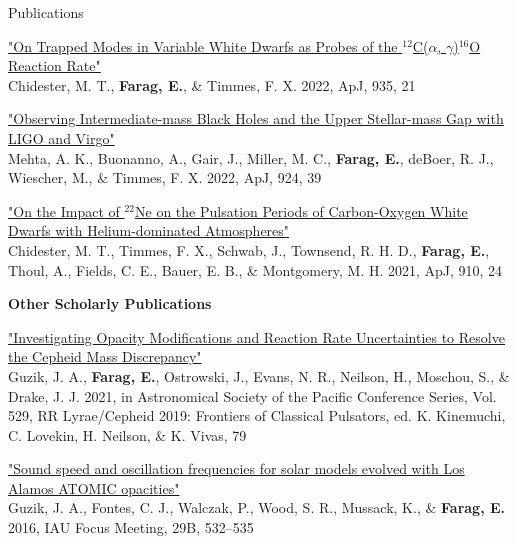 \begin{rSection}{Publications}
\begin{revnumerate}
\item \href{https://ui.adsabs.harvard.edu/abs/2022ApJ...935...21C/abstract}{"On Trapped Modes in Variable White Dwarfs as Probes of the $^{12}$C($\alpha$, $\gamma$)$^{16}$O Reaction Rate"}
\\ Chidester, M. T., \textbf{Farag, E.}, \& Timmes, F. X. 2022, ApJ, 935, 21

\item \href{https://ui.adsabs.harvard.edu/abs/2022ApJ...924...39M/abstract}{"Observing Intermediate-mass Black Holes and the Upper Stellar-mass Gap with LIGO and Virgo"}
\\ Mehta, A. K., Buonanno, A., Gair, J., Miller, M. C., \textbf{Farag, E.}, deBoer, R. J., Wiescher, M., \& Timmes, F. X. 2022, ApJ, 924, 39

\item \href{https://ui.adsabs.harvard.edu/abs/2021ApJ...910...24C/abstract}{"On the Impact of $^{22}$Ne on the Pulsation Periods of Carbon-Oxygen White Dwarfs with Helium-dominated Atmospheres"}
\\ Chidester, M. T., Timmes, F. X., Schwab, J., Townsend, R. H. D., \textbf{Farag, E.}, Thoul, A., Fields, C. E., Bauer, E. B., \& Montgomery, M. H. 2021, ApJ, 910, 24

\end{revnumerate}

\textbf{Other Scholarly Publications}
\begin{revnumerate}
\item \href{https://ui.adsabs.harvard.edu/abs/2021ASPC..529...79G/abstract}{"Investigating Opacity Modifications and Reaction Rate Uncertainties to Resolve the Cepheid Mass Discrepancy"}
\\ Guzik, J. A., \textbf{Farag, E.}, Ostrowski, J., Evans, N. R., Neilson, H., Moschou, S., \& Drake, J. J. 2021, in Astronomical Society of the Pacific Conference Series, Vol. 529, RR Lyrae/Cepheid 2019: Frontiers of Classical Pulsators, ed. K. Kinemuchi, C. Lovekin, H. Neilson, \& K. Vivas, 79

\item \href{https://ui.adsabs.harvard.edu/abs/2016IAUFM..29B.532G/abstract}{"Sound speed and oscillation frequencies for solar models evolved with Los Alamos ATOMIC opacities"}
\\ Guzik, J. A., Fontes, C. J., Walczak, P., Wood, S. R., Mussack, K., \& \textbf{Farag, E.} 2016, IAU Focus Meeting, 29B, 532--535

\end{revnumerate}
\end{rSection}
